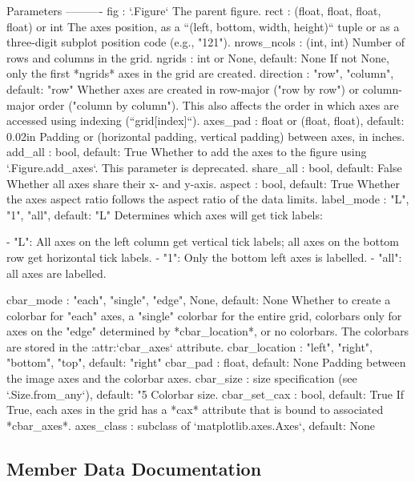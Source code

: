 \begin{DoxyVerb}Parameters
----------
fig : `.Figure`
    The parent figure.
rect : (float, float, float, float) or int
    The axes position, as a ``(left, bottom, width, height)`` tuple or
    as a three-digit subplot position code (e.g., "121").
nrows_ncols : (int, int)
    Number of rows and columns in the grid.
ngrids : int or None, default: None
    If not None, only the first *ngrids* axes in the grid are created.
direction : {"row", "column"}, default: "row"
    Whether axes are created in row-major ("row by row") or
    column-major order ("column by column").  This also affects the
    order in which axes are accessed using indexing (``grid[index]``).
axes_pad : float or (float, float), default: 0.02in
    Padding or (horizontal padding, vertical padding) between axes, in
    inches.
add_all : bool, default: True
    Whether to add the axes to the figure using `.Figure.add_axes`.
    This parameter is deprecated.
share_all : bool, default: False
    Whether all axes share their x- and y-axis.
aspect : bool, default: True
    Whether the axes aspect ratio follows the aspect ratio of the data
    limits.
label_mode : {"L", "1", "all"}, default: "L"
    Determines which axes will get tick labels:

    - "L": All axes on the left column get vertical tick labels;
      all axes on the bottom row get horizontal tick labels.
    - "1": Only the bottom left axes is labelled.
    - "all": all axes are labelled.

cbar_mode : {"each", "single", "edge", None}, default: None
    Whether to create a colorbar for "each" axes, a "single" colorbar
    for the entire grid, colorbars only for axes on the "edge"
    determined by *cbar_location*, or no colorbars.  The colorbars are
    stored in the :attr:`cbar_axes` attribute.
cbar_location : {"left", "right", "bottom", "top"}, default: "right"
cbar_pad : float, default: None
    Padding between the image axes and the colorbar axes.
cbar_size : size specification (see `.Size.from_any`), default: "5%
    Colorbar size.
cbar_set_cax : bool, default: True
    If True, each axes in the grid has a *cax* attribute that is bound
    to associated *cbar_axes*.
axes_class : subclass of `matplotlib.axes.Axes`, default: None
\end{DoxyVerb}
 

\subsection{Member Data Documentation}
\mbox{\label{classaxes__grid1_1_1axes__grid_1_1ImageGrid_a649c8da747abbcc29a2134c67b3b87ce}} 
